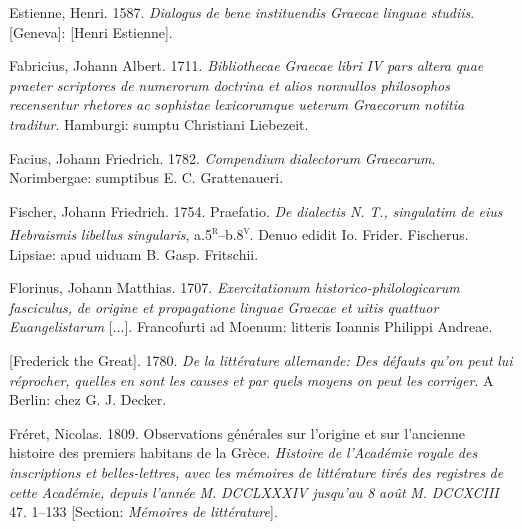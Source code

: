Estienne, Henri. 1587. \textit{Dialogus} \textit{de} \textit{bene} \textit{instituendis} \textit{Graecae} \textit{linguae} \textit{studiis}. [Geneva]: [Henri Estienne].

Fabricius, Johann Albert. 1711. \textit{Bibliothecae} \textit{Graecae} \textit{libri} \textit{IV} \textit{pars} \textit{altera} \textit{quae} \textit{praeter} \textit{scriptores} \textit{de} \textit{numerorum} \textit{doctrina} \textit{et} \textit{alios} \textit{nonnullos} \textit{philosophos} \textit{recensentur} \textit{rhetores} \textit{ac} \textit{sophistae} \textit{lexicorumque} \textit{ueterum} \textit{Graecorum} \textit{notitia} \textit{traditur}. Hamburgi: sumptu Christiani Liebezeit.

Facius, Johann Friedrich. 1782. \textit{Compendium} \textit{dialectorum} \textit{Graecarum}. Norimbergae: sumptibus E. C. Grattenaueri.

Fischer, Johann Friedrich. 1754. Praefatio. \textit{De} \textit{dialectis} \textit{N.} \textit{T.,} \textit{singulatim} \textit{de} \textit{eius} \textit{Hebraismis} \textit{libellus} \textit{singularis}, a.5\textsc{\textsuperscript{r}}–b.8\textsc{\textsuperscript{v}}. Denuo edidit Io. Frider. Fischerus. Lipsiae: apud uiduam B. Gasp. Fritschii.

Florinus, Johann Matthias. 1707. \textit{Exercitationum} \textit{historico-philologicarum} \textit{fasciculus,} \textit{de} \textit{origine} \textit{et} \textit{propagatione} \textit{linguae} \textit{Graecae} \textit{et} \textit{uitis} \textit{quattuor} \textit{Euangelistarum} [...]. Francofurti ad Moenum: litteris Ioannis Philippi Andreae.

[Frederick the Great]. 1780. \textit{De} \textit{la} \textit{littérature} \textit{allemande:} \textit{Des} \textit{défauts} \textit{qu’on} \textit{peut} \textit{lui} \textit{réprocher,} \textit{quelles} \textit{en} \textit{sont} \textit{les} \textit{causes} \textit{et} \textit{par} \textit{quels} \textit{moyens} \textit{on} \textit{peut} \textit{les} \textit{corriger}. A Berlin: chez G. J. Decker.

Fréret, Nicolas. 1809. Observations générales sur l’origine et sur l’ancienne histoire des premiers habitans de la Grèce. \textit{Histoire} \textit{de} \textit{l’Académie} \textit{royale} \textit{des} \textit{inscriptions} \textit{et} \textit{belles-lettres,} \textit{avec} \textit{les} \textit{mémoires} \textit{de} \textit{littérature} \textit{tirés} \textit{des} \textit{registres} \textit{de} \textit{cette} \textit{Académie,} \textit{depuis} \textit{l’année} \textit{M.} \textit{DCCLXXXIV} \textit{jusqu’au} \textit{8} \textit{août} \textit{M.} \textit{DCCXCIII} 47. 1–133 [Section: \textit{Mémoires} \textit{de} \textit{littérature}].

